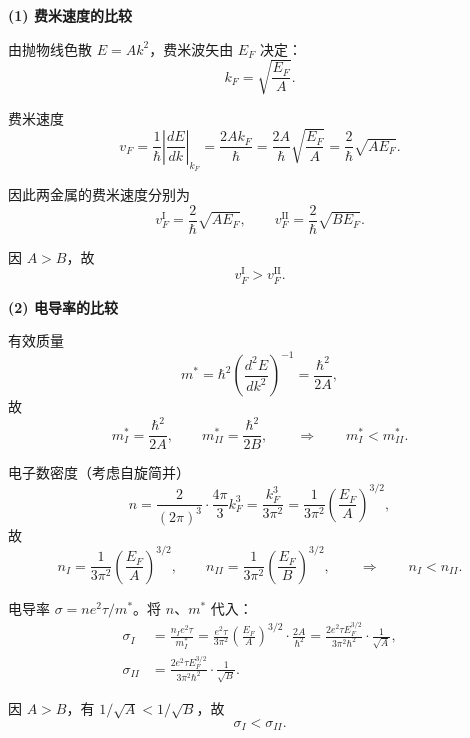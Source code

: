 \begin{derivationbox}[标准解题过程]
\textbf{(1) 费米速度的比较}

由抛物线色散 $E=Ak^2$，费米波矢由 $E_F$ 决定：
\begin{equation}
k_F=\sqrt{\frac{E_F}{A}}.
\end{equation}

费米速度
\begin{equation}
v_F=\frac{1}{\hbar}\left|\frac{dE}{dk}\right|_{k_F}=\frac{2Ak_F}{\hbar}=\frac{2A}{\hbar}\sqrt{\frac{E_F}{A}}=\frac{2}{\hbar}\sqrt{AE_F}.
\end{equation}

因此两金属的费米速度分别为
\begin{equation}
v_F^{\text{I}}=\frac{2}{\hbar}\sqrt{AE_F},\qquad
v_F^{\text{II}}=\frac{2}{\hbar}\sqrt{BE_F}.
\end{equation}

因 $A>B$，故
\begin{equation}
\boxed{v_F^{\text{I}}>v_F^{\text{II}}.}
\end{equation}

\textbf{(2) 电导率的比较}

有效质量
\begin{equation}
m^*=\hbar^2\left(\frac{d^2E}{dk^2}\right)^{-1}=\frac{\hbar^2}{2A},
\end{equation}
故
\begin{equation}
m_I^*=\frac{\hbar^2}{2A},\qquad m_{II}^*=\frac{\hbar^2}{2B},
\qquad\Rightarrow\qquad m_I^*<m_{II}^*.
\end{equation}

电子数密度（考虑自旋简并）
\begin{equation}
n=\frac{2}{(2\pi)^3}\cdot\frac{4\pi}{3}k_F^3=\frac{k_F^3}{3\pi^2}
=\frac{1}{3\pi^2}\left(\frac{E_F}{A}\right)^{3/2},
\end{equation}
故
\begin{equation}
n_I=\frac{1}{3\pi^2}\left(\frac{E_F}{A}\right)^{3/2},\qquad
n_{II}=\frac{1}{3\pi^2}\left(\frac{E_F}{B}\right)^{3/2},
\qquad\Rightarrow\qquad n_I<n_{II}.
\end{equation}

电导率 $\sigma=ne^2\tau/m^*$。将 $n$、$m^*$ 代入：
\begin{align}
\sigma_I&=\frac{n_I e^2\tau}{m_I^*}
=\frac{e^2\tau}{3\pi^2}\left(\frac{E_F}{A}\right)^{3/2}\cdot\frac{2A}{\hbar^2}
=\frac{2e^2\tau E_F^{3/2}}{3\pi^2\hbar^2}\cdot\frac{1}{\sqrt{A}},\\
\sigma_{II}&=\frac{2e^2\tau E_F^{3/2}}{3\pi^2\hbar^2}\cdot\frac{1}{\sqrt{B}}.
\end{align}

因 $A>B$，有 $1/\sqrt{A}<1/\sqrt{B}$，故
\begin{equation}
\boxed{\sigma_I<\sigma_{II}.}
\end{equation}
\end{derivationbox}

